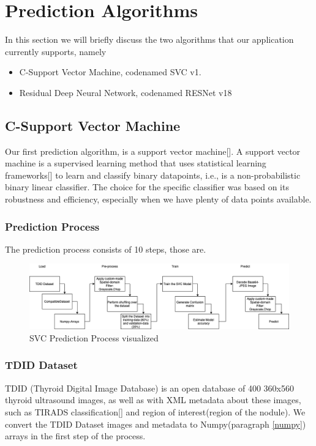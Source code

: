 	\section{Prediction Algorithms}
		In this section we will briefly discuss the two algorithms that our application currently supports, namely 
		\begin{itemize}
			\item C-Support Vector Machine, codenamed SVC v1.
			\item Residual Deep Neural Network, codenamed RESNet v18
		\end{itemize}
		\subsection{C-Support Vector Machine}
			Our first prediction algorithm, is a support vector machine[\cite{support-vector-machines}]. 
			A support vector machine is a supervised learning method that uses statistical learning frameworks[\cite{vapnik_2008}]
			to learn and classify binary datapoints, i.e., is a non-probabilistic binary linear classifier. The choice for the specific 
			classifier was based on its robustness and efficiency, especially when we have plenty of data points available. 
			\subsubsection{Prediction Process}
				The prediction process consists of 10 steps, those are.\pagebreak
				\begin{figure}[H]
					\iftrue
					\caption{SVC Prediction Process visualized}
					\centering
					\includegraphics[angle=90,origin=c,scale=0.7]{figures/svc-process}
					\fi
				\end{figure}\pagebreak
			\subsubsection{TDID Dataset}
				TDID (Thyroid Digital Image Database) is an open database of 400 360x560  thyroid ultrasound images, as well as with XML metadata 
				about these images, such as TIRADS classification[\cite{li_ma_cui_2018}] and region of interest(region of the nodule).
				We convert the TDID Dataset images and metadata to Numpy(paragraph \ref{numpy}) arrays in the first step of the process.
